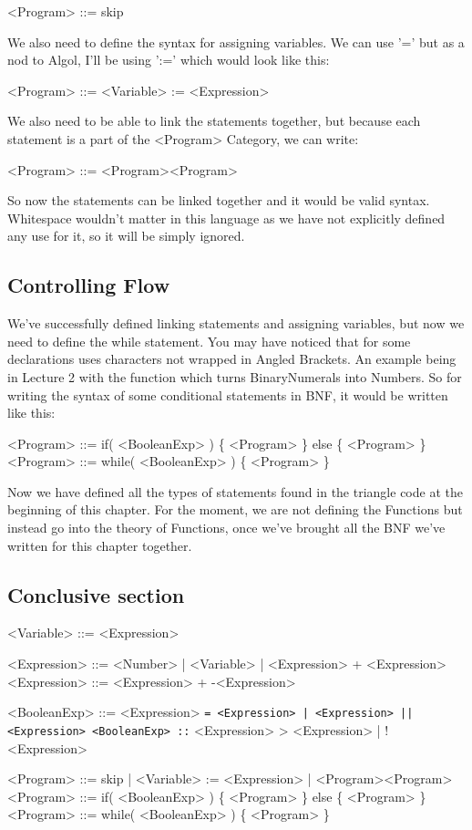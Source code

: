 \documentclass[12pt]{article}
\begin{document}
<Program> ::= skip

We also need to define the syntax for assigning variables.  We can use '=' but
as a nod to Algol, I'll be using ':=' which would look like this:

<Program> ::= <Variable> := <Expression>

We also need to be able to link the statements together, but because each
statement is a part of the <Program> Category, we can write:

<Program> ::= <Program><Program>

So now the statements can be linked together and it would be valid syntax.
Whitespace wouldn't matter in this language as we have not explicitly defined
any use for it, so it will be simply ignored.

\subsection{Controlling Flow}
\label{sec-3-6}
We've successfully defined linking statements and assigning variables, but now
we need to define the while statement.  You may have noticed that for some
declarations uses characters not wrapped in Angled Brackets.  An example being
in Lecture 2 with the function which turns BinaryNumerals into Numbers.
So for writing the syntax of some conditional statements in BNF, it would be
written like this:

<Program> ::= if( <BooleanExp> ) \{ <Program> \} else \{ <Program> \}
<Program> ::= while( <BooleanExp> ) \{ <Program> \}

Now we have defined all the types of statements found in the triangle code at
the beginning of this chapter.  For the moment, we are not defining the
Functions but instead go into the theory of Functions, once we've brought all
the BNF we've written for this chapter together.

\subsection{Conclusive section}
\label{sec-3-7}
<Variable>   ::= <Expression>

<Expression> ::= <Number> | <Variable> | <Expression> + <Expression>
<Expression> ::= <Expression> + -<Expression>

<BooleanExp> ::= <Expression> \texttt{= <Expression> | <Expression> || <Expression>
<BooleanExp> ::} <Expression> >  <Expression> | !<Expression>

<Program> ::= skip | <Variable> := <Expression> | <Program><Program>
<Program> ::= if( <BooleanExp> ) \{ <Program> \} else \{ <Program> \}
<Program> ::= while( <BooleanExp> ) \{ <Program> \}
\end{document}
